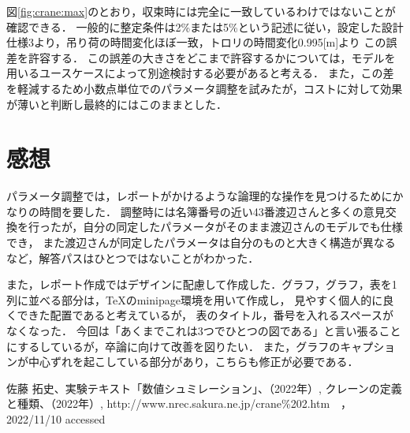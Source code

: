 \documentclass[dvipdfmx,titlepage,a4j]{jsarticle}  %
\begin{document}
図\ref{fig:crane:max}のとおり，収束時には完全に一致しているわけではないことが確認できる．
一般的に整定条件は2\%または5\%という記述に従い，設定した設計仕様3より，吊り荷の時間変化ほぼ一致，トロリの時間変化0.995[m]より
この誤差を許容する．
この誤差の大きさをどこまで許容するかについては，モデルを用いるユースケースによって別途検討する必要があると考える．
また，この差を軽減するため小数点単位でのパラメータ調整を試みたが，コストに対して効果が薄いと判断し最終的にはこのままとした．

\section{感想}
パラメータ調整では，レポートがかけるような論理的な操作を見つけるためにかなりの時間を要した．
調整時には名簿番号の近い43番渡辺さんと多くの意見交換を行ったが，自分の同定したパラメータがそのまま渡辺さんのモデルでも仕様でき，
また渡辺さんが同定したパラメータは自分のものと大きく構造が異なるなど，解答パスはひとつではないことがわかった．

また，レポート作成ではデザインに配慮して作成した．グラフ，グラフ，表を1列に並べる部分は，\TeX のminipage環境を用いて作成し，
見やすく個人的に良くできた配置であると考えているが，
表のタイトル，番号を入れるスペースがなくなった．
今回は「あくまでこれは3つでひとつの図である」と言い張ることにするしているが，卒論に向けて改善を図りたい．
また，グラフのキャプションが中心ずれを起こしている部分があり，こちらも修正が必要である．

\begin{thebibliography}{99}
   佐藤 拓史、実験テキスト「数値シュミレーション」、（2022年）,
   クレーンの定義と種類、（2022年）, http://www.nrec.sakura.ne.jp/crane\%202.htm　，2022/11/10 accessed
\end{thebibliography}
\end{document}
